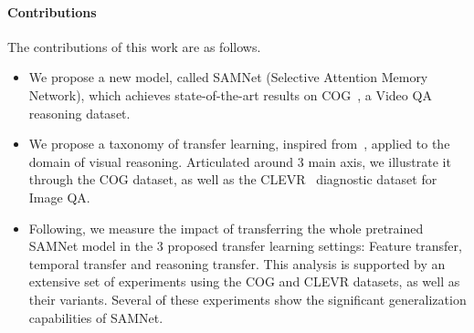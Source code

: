 \paragraph{Contributions}
The contributions of this work are as follows.
\begin{itemize}
	\compresslist
	\item We propose a new model, called SAMNet (Selective Attention Memory Network), which achieves state-of-the-art results on COG~\cite{yang2018dataset}, a Video QA reasoning dataset.
	\item We propose a taxonomy of transfer learning, inspired from~\cite{pan2009survey}, applied to the domain of visual reasoning. Articulated around 3 main axis, we illustrate it through the COG dataset, as well as the CLEVR~\cite{johnson2017clevr} diagnostic dataset for Image QA.
	\item Following, we measure the impact of transferring the whole pretrained SAMNet model in the 3 proposed transfer learning settings: Feature transfer, temporal transfer and reasoning transfer. This analysis is supported by an extensive set of experiments using the COG and CLEVR datasets, as well as their variants. Several of these experiments show the significant generalization capabilities of SAMNet.
\end{itemize}


